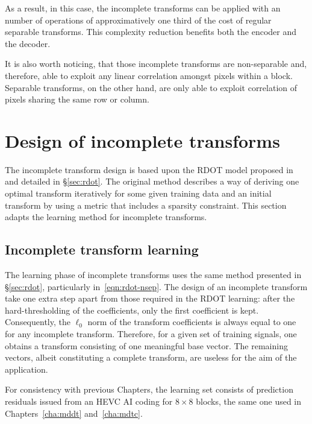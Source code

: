 \documentclass[11pt,a4paper,openright,twoside]{book}
\numberwithin{equation}{section} %
\numberwithin{figure}{section} %
\numberwithin{table}{section} %
\begin{document}
As a result, in this case, the incomplete transforms can be applied with an
number of operations of approximatively one third of the cost of regular
separable transforms.
This complexity reduction benefits both the encoder and the decoder.

It is also worth noticing, that those incomplete transforms are non-separable
and, therefore, able to exploit any linear correlation amongst pixels
within a block.
Separable transforms, on the other hand, are only able to exploit correlation
of pixels sharing the same row or column.

\section{Design of incomplete transforms}
\label{sec:it_design_of_incomplete_transforms}

The incomplete transform design is based upon the \ac{RDOT} model proposed
in~\cite{sezer-08-sparse-orthonormal-transforms} and detailed in
\S\ref{sec:rdot}.
The original method describes a way of deriving one optimal transform
iteratively for some given training data and an initial transform by using a
metric that includes a sparsity constraint.
This section adapts the learning method for incomplete transforms.

\subsection{Incomplete transform learning}
\label{sub:it_incomplete_transform_learning}

The learning phase of incomplete transforms uses the same method presented in
\S\ref{sec:rdot}, particularly in~\eqref{eqn:rdot-nsep}.
The design of an incomplete transform take one extra step apart from those
required in the \ac{RDOT} learning:
after the hard-thresholding of the coefficients, only the first coefficient is
kept.
Consequently, the $\ell_0$ norm of the transform coefficients is always equal
to one for any incomplete transform.
Therefore, for a given set of training signals, one obtains a transform
consisting of one meaningful base vector.
The remaining vectors, albeit constituting a complete transform, are useless
for the aim of the application.

For consistency with previous Chapters, the learning set consists of
prediction residuals issued from an \ac{HEVC} \ac{AI} coding for $8\times8$
blocks, the same one used in Chapters~\ref{cha:mddt} and~\ref{cha:mdtc}.
\end{document}
